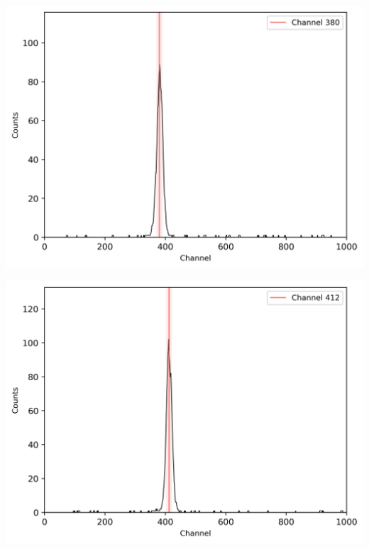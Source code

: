 \begin{multicols}{2}
\begin{center}
\begin{adjustbox}{max width=\linewidth, keepaspectratio}
        \end{adjustbox}
        \label{fig:60CoZeitspektrum20ns}
    \end{center}
\endminipage
%
\vspace{10mm}
%
\minipage{\linewidth}
    \begin{center}
        \captionsetup{type=figure}
        \begin{adjustbox}{max width=\linewidth, keepaspectratio}
            \includegraphics[]{png/60CoZeitspektrum40ns}
        \end{adjustbox}
        \label{fig:60CoZeitspektrum40ns}
    \end{center}
\endminipage
%
\vspace{10mm}
%
\minipage{\linewidth}
    \begin{center}
        \captionsetup{type=figure}
        \begin{adjustbox}{max width=\linewidth, keepaspectratio}
            \includegraphics[]{png/60CoZeitspektrum60ns}

\end{adjustbox}
\end{center}
\end{multicols}
